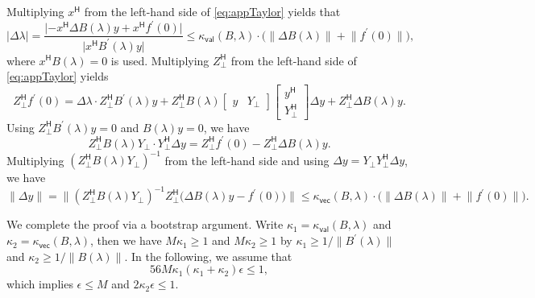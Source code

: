\documentclass[a4paper,11pt]{article}
\newcommand{\Htran}{\mathsf{H}}
\newcommand{\kval}{\kappa_{\mathsf{val}}}
\newcommand{\kvec}{\kappa_{\mathsf{vec}}}
\providecommand{\abs}[1]{\lvert#1\rvert}
\providecommand{\norm}[1]{\lVert#1\rVert}
\providecommand{\bignorm}[1]{\bigl\lVert#1\bigr\rVert}
\begin{document}
    Multiplying $x^{\Htran}$ from the left-hand side of \cref{eq:appTaylor} yields that 
    \begin{equation}
        \label{eq:appPertPf2}
        \abs{\Delta\lambda} = \frac{\abs{-x^{\Htran}\Delta B(\lambda)y+x^{\Htran}f^{\prime}(0)}}{\abs{x^{\Htran}B^{\prime}(\lambda)y}}\leq \kval(B,\lambda)\cdot\bigl(\norm{\Delta B(\lambda)} + \norm{f^{\prime}(0)}\bigr),
    \end{equation}
    where $x^{\Htran}B(\lambda)=0$ is used. Multiplying $Z_{\perp}^{\Htran}$ from the left-hand side of \cref{eq:appTaylor} yields
    \begin{equation*}
        Z_{\perp}^{\Htran}f^{\prime}(0) = 
        \Delta \lambda \cdot Z_{\perp}^{\Htran}B^{\prime}(\lambda)y+
        Z_{\perp}^{\Htran}B(\lambda)\begin{bmatrix}
            y&Y_{\perp}
        \end{bmatrix}
        \begin{bmatrix}
            y^{\Htran}\\ Y_{\perp}^{\Htran}
        \end{bmatrix}
        \Delta y  + Z_{\perp}^{\Htran}\Delta B(\lambda)y. 
    \end{equation*}
    Using $Z_{\perp}^{\Htran}B^{\prime}(\lambda)y=0$ and $B(\lambda)y=0$, we have 
    \begin{equation*}
        Z_{\perp}^{\Htran}B(\lambda)Y_{\perp}\cdot Y_{\perp}^{\Htran}\Delta y
         = Z_{\perp}^{\Htran}f^{\prime}(0)- Z_{\perp}^{\Htran}\Delta B(\lambda)y. 
    \end{equation*}
    Multiplying $(Z_{\perp}^{\Htran}B(\lambda)Y_{\perp})^{-1}$ from the left-hand side and using $\Delta y = Y_{\perp}Y_{\perp}^{\Htran}\Delta y$, we have 
    \begin{equation}
        \label{eq:appPertPf3}
        \norm{\Delta y} = \bignorm{(Z_{\perp}^{\Htran}B(\lambda)Y_{\perp})^{-1}Z_{\perp}^{\Htran}\bigl(\Delta B(\lambda)y-f^{\prime}(0)\bigr)} \leq \kvec(B,\lambda)\cdot \bigl(\norm{\Delta B(\lambda)}+\norm{f^{\prime}(0)}\bigr).
    \end{equation}
        
We complete the proof via a bootstrap argument. Write $\kappa_{1}=\kval(B,\lambda)$ and $\kappa_{2}=\kvec(B,\lambda)$, then we have  $M\kappa_{1}\geq 1$ and $M\kappa_{2}\geq 1$ by $\kappa_{1}\geq 1/\norm{B^{\prime}(\lambda)}$ and $\kappa_{2}\geq 1/\norm{B(\lambda)}$. In the following, we assume that 
\begin{equation}
    \label{eq:appPertEps}
    56M\kappa_{1}(\kappa_{1}+\kappa_{2})\epsilon\leq 1,
\end{equation}
which implies $\epsilon\leq M$ and $2\kappa_{2}\epsilon\leq 1$.
\end{document}
